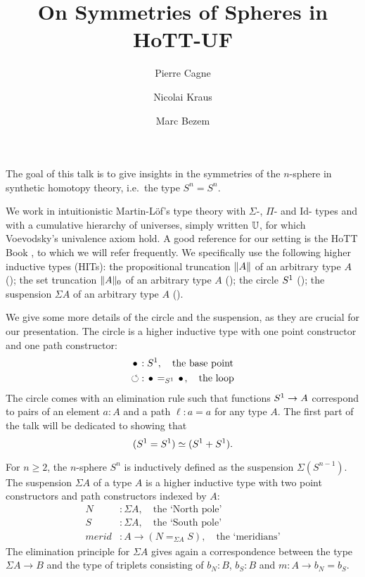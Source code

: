 \documentclass{easychair}
\title{On Symmetries of Spheres in HoTT-UF}
\author{Pierre Cagne \and Nicolai Kraus \and Marc Bezem}
\institute{
}
\newcommand{\mrd}{\mathit{merid}}%
\newcommand{\susp}[1]{\Sigma{#1}}%
\def\U{\universe U}%
\begin{document}
\maketitle

The goal of this talk is to give insights in the symmetries of the
$n$-sphere in synthetic homotopy theory, i.e.\ the type $S^n = S^n$.

We work in intuitionistic Martin-Löf's type theory with $\Sigma$-,
$\Pi$- and $\mathrm{Id}$- types and with a cumulative hierarchy of
universes, simply written $\U$, for which Voevodsky's univalence axiom
hold.  A good reference for our setting is the HoTT Book \cite{HoTT},
to which we will refer frequently. We specifically use the following
higher inductive types (HITs): the propositional truncation
$\lVert A\rVert$ of an arbitrary type $A$ (\cite[Ch.~3.7]{HoTT}); the set
truncation $\lVert A\rVert_0$ of an arbitrary type $A$
(\cite[Ch.~6.9]{HoTT}); the circle ${S^1}$ (\cite[Ch.~6.4]{HoTT}); the
suspension $\susp A$ of an arbitrary type $A$ (\cite[Ch.~6.5]{HoTT}).


We give some more details of the circle and the suspension, as they
are crucial for our presentation. The circle is a higher inductive
type with one point constructor and one path constructor:
\begin{align*}
  \base &: \Sc,  \quad\text{the base point}\\
  \Sloop &: \base =_{\Sc} \base,  \quad\text{the loop}
\end{align*}
The circle comes with an elimination rule such that functions
${S^1} \to A$ correspond to pairs of an element $a:A$ and a path
$\ell: a=a$ for any type $A$. The first part of the talk will be
dedicated to showing that
\begin{equation}
  \label{eq:s1-result}%
  (\Sc = \Sc) \weq (\Sc+\Sc).
\end{equation}

For $n\geq 2$, the $n$-sphere $S^n$ is inductively defined as the
suspension $\susp {(S^{n-1})}$. The suspension $\susp A$ of a type $A$
is a higher inductive type with two point constructors and path
constructors indexed by $A$:
\begin{align*}
  \label{eq:suspension}
  N &: \susp A, \quad\text{the `North pole'}\\
  S &: \susp A, \quad\text{the `South pole'}\\
  \mrd &: A \to (N =_{\susp A} S), \quad\text{the `meridians'}
\end{align*}
The elimination principle for $\susp A$ gives again a correspondence
between the type $\susp A \to B$ and the type of triplets consisting
of $b_N: B$, $b_S: B$ and $m: A \to b_N=b_S$.
\end{document}
